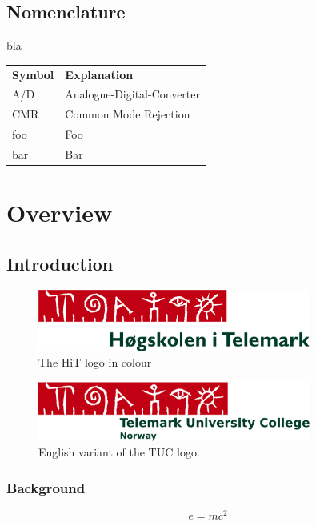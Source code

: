 \documentclass[11pt,openright]{book} %
\begin{document}
\listoftables  %

\chapter*{Nomenclature}
\label{sec:nomenclature}
bla

\begin{longtable}{ll}
  \textbf{Symbol} & \textbf{Explanation}\endhead\\
  A/D	& Analogue-Digital-Converter \\
  CMR	& Common Mode Rejection \\
  foo	& Foo \\
  bar 	& Bar
\end{longtable}


\mainmatter
\part{Overview}  %
\label{part:overview}
\chapter{Introduction}
\label{ch:intro}
\lipsum[4]
\begin{figure}[!ht]
  \centering
  \includegraphics[width=0.8\textwidth]{HiT-logo}
  \caption{The HiT logo in colour}
  \label{fig:hit-logo}
\end{figure}
\lipsum[4]
\begin{figure}[!ht]
  \centering
  \includegraphics[width=0.8\textwidth]{HiT-logo-en}
  \caption{English variant of the TUC logo.}
  \label{fig:hit-logo-bw}
\end{figure}
\lipsum

\section{Background}
\label{sec:back}
\lipsum[4]
\begin{equation}
  e = m c^2
\end{equation}
\lipsum
\end{document}
